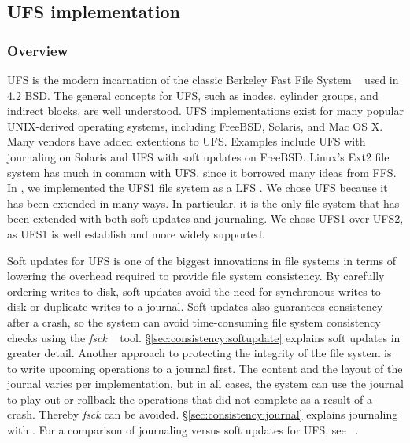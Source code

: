 \subsection{UFS implementation}
\label{sec:modules:ufs}

\subsubsection {Overview}
UFS is the modern incarnation of the classic Berkeley Fast File System
~\cite{mckusick84fast} used in 4.2 BSD. The general concepts for UFS, such as
inodes, cylinder groups, and indirect blocks, are well understood. UFS
implementations exist for many popular UNIX-derived operating systems, including
FreeBSD, Solaris, and Mac OS X. Many vendors have added extentions to UFS.
Examples include UFS with journaling on Solaris and UFS with soft updates on
FreeBSD. Linux's Ext2 file system has much in common with UFS, since it borrowed
many ideas from FFS. In \Kudos, we implemented the UFS1 file system as a LFS
\module. We chose UFS because it has been extended in many ways. In particular,
it is the only file system that has been extended with both soft updates and
journaling. We chose UFS1 over UFS2, as UFS1 is well establish and more widely
supported.

Soft updates for UFS is one of the biggest innovations in file systems in terms
of lowering the overhead required to provide file system consistency. By
carefully ordering writes to disk, soft updates avoid the need for synchronous
writes to disk or duplicate writes to a journal. Soft updates also guarantees
consistency after a crash, so the system can avoid time-consuming file system
consistency checks using the \emph{fsck} ~\cite{mckusick94fsck} tool.
\S\ref{sec:consistency:softupdate} explains soft updates in greater detail.
Another approach to protecting the integrity of the file system is to write
upcoming operations to a journal first. The content and the layout of the
journal varies per implementation, but in all cases, the system can use the
journal to play out or rollback the operations that did not complete as a result
of a crash. Thereby \emph{fsck} can be avoided. \S\ref{sec:consistency:journal}
explains journaling with \chdescs. For a comparison of journaling versus soft
updates for UFS, see ~\cite{seltzer00journaling}.

